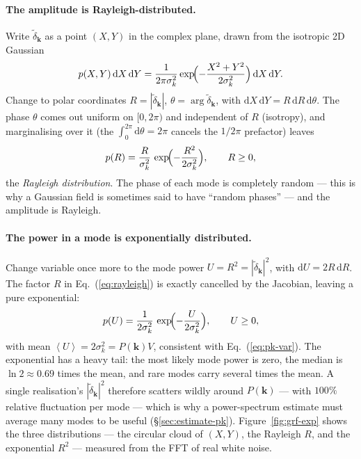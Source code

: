 \documentclass[12pt]{article}
\newcommand{\bk}{\mathbf{k}}
\newcommand{\avg}[1]{\left\langle #1 \right\rangle}
\begin{document}
\paragraph{The amplitude is Rayleigh-distributed.}  Write
$\tilde\delta_\bk$ as a point $(X, Y)$ in the complex plane, drawn from
the isotropic 2D Gaussian
\begin{equation}
  p(X, Y)\,\mathrm dX\,\mathrm dY
    = \frac{1}{2\pi\sigma_k^2}
      \exp\!\Bigl(-\frac{X^2+Y^2}{2\sigma_k^2}\Bigr)\,\mathrm dX\,\mathrm dY.
\end{equation}
Change to polar coordinates $R = |\tilde\delta_\bk|$, $\theta =
\arg\tilde\delta_\bk$, with $\mathrm dX\,\mathrm dY = R\,\mathrm
dR\,\mathrm d\theta$.  The phase $\theta$ comes out uniform on
$[0, 2\pi)$ and independent of $R$ (isotropy), and marginalising over it
(the $\int_0^{2\pi}\mathrm d\theta = 2\pi$ cancels the $1/2\pi$
prefactor) leaves
\begin{equation}
  p(R) = \frac{R}{\sigma_k^2}\,
         \exp\!\Bigl(-\frac{R^2}{2\sigma_k^2}\Bigr), \qquad R \ge 0,
  \label{eq:rayleigh}
\end{equation}
the \emph{Rayleigh distribution}.  The phase of each mode is completely
random --- this is why a Gaussian field is sometimes said to have
``random phases'' --- and the amplitude is Rayleigh.

\paragraph{The power in a mode is exponentially distributed.}  Change
variable once more to the mode power $U = R^2 = |\tilde\delta_\bk|^2$,
with $\mathrm dU = 2R\,\mathrm dR$.  The factor $R$ in
Eq.~(\ref{eq:rayleigh}) is exactly cancelled by the Jacobian, leaving a
pure exponential:
\begin{equation}
  p(U) = \frac{1}{2\sigma_k^2}\,
         \exp\!\Bigl(-\frac{U}{2\sigma_k^2}\Bigr), \qquad U \ge 0,
  \label{eq:exponential}
\end{equation}
with mean $\avg{U} = 2\sigma_k^2 = P(\bk)V$, consistent with
Eq.~(\ref{eq:pk-var}).  The exponential has a heavy tail: the most likely
mode power is zero, the median is $\ln 2 \approx 0.69$ times the mean,
and rare modes carry several times the mean.  A single realisation's
$|\tilde\delta_\bk|^2$ therefore scatters wildly around $P(\bk)$ --- with
$100\%$ relative fluctuation per mode --- which is why a power-spectrum
estimate must average many modes to be useful (\S\ref{sec:estimate-pk}).
Figure~\ref{fig:grf-exp} shows the three distributions --- the circular
cloud of $(X, Y)$, the Rayleigh $R$, and the exponential $R^2$ ---
measured from the FFT of real white noise.
\end{document}
